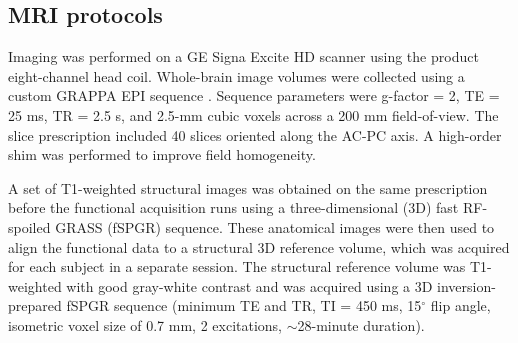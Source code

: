 \documentclass[5p,authoryear]{elsarticle}
\begin{document}
\subsection{MRI protocols}
Imaging was performed on a GE Signa Excite HD scanner using the product eight-channel head coil.
Whole-brain image volumes were collected using a custom GRAPPA EPI sequence \citep{Griswold2002}. 
Sequence parameters were g-factor = 2,  TE = 25 ms, TR = 2.5 s, and  2.5-mm cubic voxels across a 200 mm field-of-view. 
The slice prescription included 40 slices oriented along the AC-PC axis. 
A high-order shim was  performed to improve field homogeneity.

A set of T1-weighted structural images was obtained on the same prescription before the functional acquisition runs using a three-dimensional (3D) fast RF-spoiled GRASS (fSPGR) sequence. 
These anatomical images were then used to align the functional data to a structural 3D reference volume, which was acquired for each subject in a separate session. 
The structural reference volume was T1-weighted with good gray-white contrast and was acquired using a 3D inversion-prepared fSPGR sequence (minimum TE and TR, TI = 450 ms, 15$^\circ$ flip angle, isometric voxel size of 0.7 mm, 2 excitations, $\sim$28-minute duration).

\end{document}
